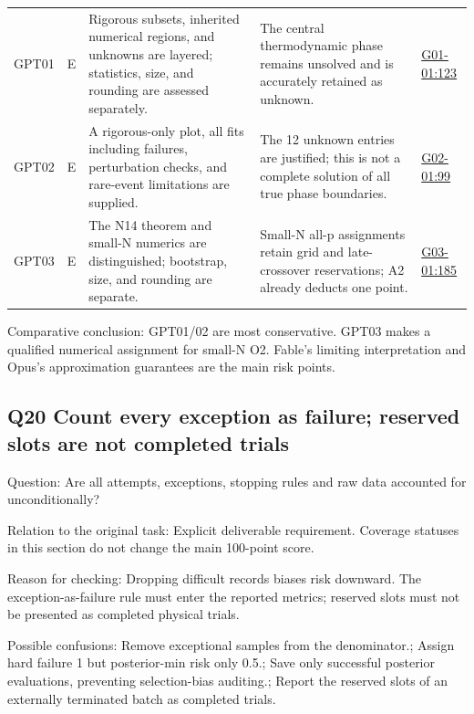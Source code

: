 \documentclass[11pt,a4paper]{article}
\begin{document}
{\begin{longtable}
{}GPT01 & E & Rigorous subsets,\allowbreak{} inherited numerical regions,\allowbreak{} and unknowns are layered; statistics,\allowbreak{} size,\allowbreak{} and rounding are assessed separately. & The central thermodynamic phase remains unsolved and is accurately retained as unknown. & \hyperref[src:G01-01]{G01-01:123}\tabularnewline
{}GPT02 & E & A rigorous-only plot,\allowbreak{} all fits including failures,\allowbreak{} perturbation checks,\allowbreak{} and rare-event limitations are supplied. & The 12 unknown entries are justified; this is not a complete solution of all true phase boundaries. & \hyperref[src:G02-01]{G02-01:99}\tabularnewline
{}GPT03 & E & The N14 theorem and small-N numerics are distinguished; bootstrap,\allowbreak{} size,\allowbreak{} and rounding are separate. & Small-N all-p assignments retain grid and late-crossover reservations; A2 already deducts one point. & \hyperref[src:G03-01]{G03-01:185}\tabularnewline
\bottomrule
\end{longtable}
}
Comparative conclusion: GPT01/\allowbreak{}02 are most conservative. GPT03 makes a qualified numerical assignment for small-N O2. Fable’s limiting interpretation and Opus’s approximation guarantees are the main risk points.

\clearpage
\subsection{Q20 Count every exception as failure; reserved slots are not completed trials}
\label{aspect:Q20}
Question: Are all attempts,\allowbreak{} exceptions,\allowbreak{} stopping rules and raw data accounted for unconditionally?

Relation to the original task: Explicit deliverable requirement. Coverage statuses in this section do not change the main 100-point score.

Reason for checking: Dropping difficult records biases risk downward. The exception-as-failure rule must enter the reported metrics; reserved slots must not be presented as completed physical trials.

Possible confusions: Remove exceptional samples from the denominator.; Assign hard failure 1 but posterior-min risk only 0.5.; Save only successful posterior evaluations,\allowbreak{} preventing selection-bias auditing.; Report the reserved slots of an externally terminated batch as completed trials.
\end{document}
